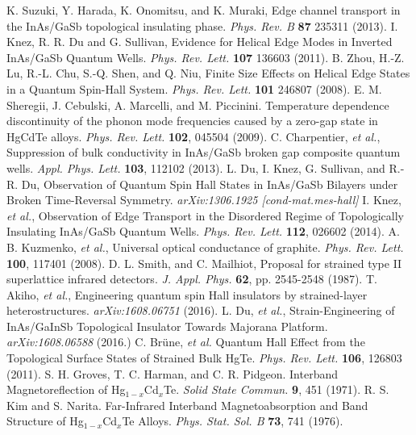 \documentclass[titlepage,a4paper]{book}
\begin{document}
\begin{thebibliography}{199}
K. Suzuki, Y. Harada, K. Onomitsu, and K. Muraki, Edge channel transport in the InAs/GaSb topological insulating phase. \textit{Phys. Rev. B} \textbf{87}  235311 (2013).
I. Knez, R. R. Du and G. Sullivan, Evidence for Helical Edge Modes in Inverted InAs/GaSb Quantum Wells. \textit{Phys. Rev. Lett.} \textbf{107} 136603 (2011).
B. Zhou, H.-Z. Lu, R.-L. Chu, S.-Q. Shen, and Q. Niu, Finite Size Effects on Helical Edge States in a Quantum Spin-Hall System. \textit{Phys. Rev. Lett.} \textbf{101} 246807 (2008).
E. M. Sheregii, J. Cebulski, A. Marcelli, and M. Piccinini. Temperature dependence discontinuity of the phonon mode frequencies caused by a zero-gap state in HgCdTe alloys. \textit{Phys. Rev. Lett.} \textbf{102}, 045504 (2009). 
C. Charpentier, \textit{et al.}, Suppression of bulk conductivity in InAs/GaSb broken gap composite quantum wells. \textit{Appl. Phys. Lett.} \textbf{103}, 112102 (2013).
L. Du, I. Knez, G. Sullivan, and R.-R. Du, Observation of Quantum Spin Hall States in InAs/GaSb Bilayers under Broken Time-Reversal Symmetry. \textit{arXiv:1306.1925 [cond-mat.mes-hall]}
 I. Knez, \textit{et al.}, Observation of Edge Transport in the Disordered Regime of Topologically Insulating InAs/GaSb Quantum Wells. \textit{Phys. Rev. Lett.} \textbf{112}, 026602 (2014).
A. B. Kuzmenko, \textit{et al.}, Universal optical conductance of graphite. \textit{Phys. Rev. Lett.} \textbf{100}, 117401 (2008).
D. L. Smith, and C. Mailhiot, Proposal for strained type II superlattice infrared detectors. \textit{J. Appl. Phys.} \textbf{62}, pp. 2545-2548 (1987). 
T. Akiho, \textit{et al.}, Engineering quantum spin Hall insulators by strained-layer heterostructures. \textit{arXiv:1608.06751} (2016).
L. Du, \textit{et al.}, Strain-Engineering of InAs/GaInSb Topological Insulator Towards Majorana Platform. \textit{arXiv:1608.06588} (2016.)
C. Brüne, \textit{et al.} Quantum Hall Effect from the Topological Surface States of Strained Bulk HgTe. \textit{Phys. Rev. Lett.} \textbf{106}, 126803 (2011).
S. H. Groves, T. C. Harman, and C. R. Pidgeon. Interband Magnetoreflection of Hg$_{1-x}$Cd$_x$Te. \textit{Solid State Commun.} \textbf{9}, 451 (1971).
R. S. Kim and S. Narita. Far-Infrared Interband Magnetoabsorption and Band Structure of Hg$_{1-x}$Cd$_x$Te Alloys. \textit{Phys. Stat. Sol. B} \textbf{73}, 741 (1976).

\end{thebibliography}
\end{document}
